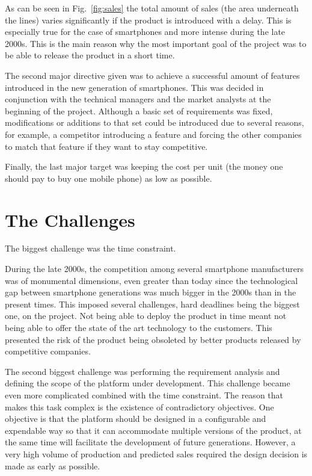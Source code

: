 \documentclass[journal]{IEEEtran}
\begin{document}
As can be seen in Fig.~\ref{fig:sales} the total amount of sales (the area underneath the lines) varies significantly if the product is introduced with a delay. This is especially true for the case of smartphones and more intense during the late 2000s. This is the main reason why the most important goal of the project was to be able to release the product in a short time.

The second major directive given was to achieve a successful amount of features introduced in the new generation of smartphones. This was decided in conjunction with the technical managers and the market analysts at the beginning of the project. Although a basic set of requirements was fixed, modifications or additions to that set could be introduced due to several reasons, for example, a competitor introducing a feature and forcing the other companies to match that feature if they want to stay competitive.

Finally, the last major target was keeping the cost per unit (the money one should pay to buy one mobile phone) as low as possible. 

\section{The Challenges}
The biggest challenge was the time constraint. 

During the late 2000s, the competition among several smartphone manufacturers was of monumental dimensions, even greater than today since the technological gap between smartphone generations was much bigger in the 2000s than in the present times. This imposed several challenges, hard deadlines being the biggest one, on the project. Not being able to deploy the product in time meant not being able to offer the state of the art technology to the customers. This presented the risk of the product being obsoleted by better products released by competitive companies.

The second biggest challenge was performing the requirement analysis and defining the scope of the platform under development. This challenge became even more complicated combined with the time constraint. The reason that makes this task complex is the existence of contradictory objectives. One objective is that the platform should be designed in a configurable and expendable way so that it can accommodate multiple versions of the product, at the same time will facilitate the development of future generations. However, a very high volume of production and predicted sales required the design decision is made as early as possible.
\end{document}
